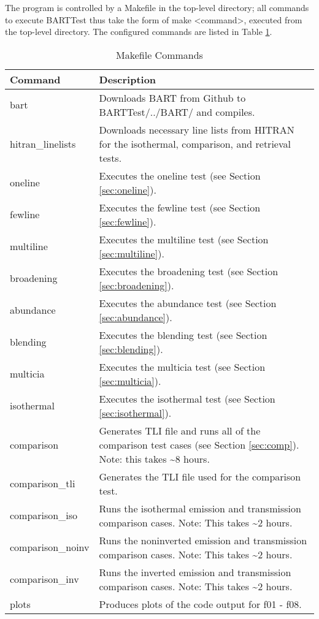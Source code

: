\documentclass[letterpaper, 12pt]{article}
\begin{document}
The program is controlled by a Makefile in the top-level directory; all 
commands to execute BARTTest thus take the form of 
make {\textless}command{\textgreater}, executed 
from the top-level directory. The configured commands are listed in 
Table \ref{tbl:makecommands}.

\begin{table}[ht]
\label{tbl:makecommands}
\centering
\caption{Makefile Commands}
\begin{tabular}{ll}
\hline\hline
Command & Description\\
\hline
bart & Downloads BART from Github to BARTTest/../BART/ and compiles.\\
hitran{\_}linelists & Downloads necessary line lists from HITRAN for the 
isothermal, comparison, and retrieval tests.\\
oneline & Executes the oneline test (see Section \ref{sec:oneline}).\\
fewline & Executes the fewline test (see Section \ref{sec:fewline}).\\
multiline & Executes the multiline test (see Section \ref{sec:multiline}).\\
broadening & Executes the broadening test (see Section \ref{sec:broadening}).\\
abundance & Executes the abundance test (see Section \ref{sec:abundance}).\\
blending & Executes the blending test (see Section \ref{sec:blending}).\\
multicia & Executes the multicia test (see Section \ref{sec:multicia}).\\
isothermal & Executes the isothermal test (see Section \ref{sec:isothermal}).\\
comparison & Generates TLI file and runs all of the comparison test cases (see Section \ref{sec:comp}). Note: this takes {\sim}8 hours.\\
comparison{\_}tli & Generates the TLI file used for the comparison test.\\
comparison{\_}iso & Runs the isothermal emission and transmission comparison cases. Note: This takes {\sim}2 hours.\\
comparison{\_}noinv & Runs the noninverted emission and transmission comparison 
cases. Note: This takes {\sim}2 hours.\\
comparison{\_}inv & Runs the inverted emission and transmission comparison cases. Note: This takes {\sim}2 hours.\\
plots & Produces plots of the code output for f01 - f08.\\

\end{tabular}
\end{table}
\end{document}
